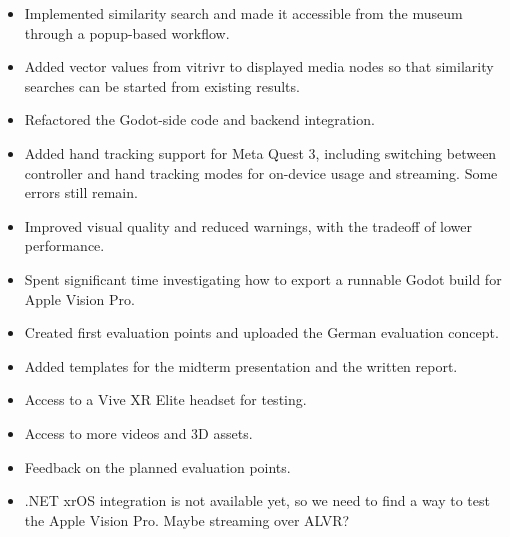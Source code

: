 \documentclass{article}
\begin{document}
\done
\begin{itemize}
    \item Implemented similarity search and made it accessible from the museum through a popup-based workflow.
    \item Added vector values from vitrivr to displayed media nodes so that similarity searches can be started from existing results.
    \item Refactored the Godot-side code and backend integration.
    \item Added hand tracking support for Meta Quest 3, including switching between controller and hand tracking modes for on-device usage and streaming. Some errors still remain.
    \item Improved visual quality and reduced warnings, with the tradeoff of lower performance.
    \item Spent significant time investigating how to export a runnable Godot build for Apple Vision Pro.
    \item Created first evaluation points and uploaded the German evaluation concept.
    \item Added templates for the midterm presentation and the written report.
\end{itemize}

\support
\begin{itemize}
    \item Access to a Vive XR Elite headset for testing.
    \item Access to more videos and 3D assets.
    \item Feedback on the planned evaluation points.
    \item .NET xrOS integration is not available yet, so we need to find a way to test the Apple Vision Pro. Maybe streaming over ALVR?
\end{itemize}

\plan
{}
\end{document}
